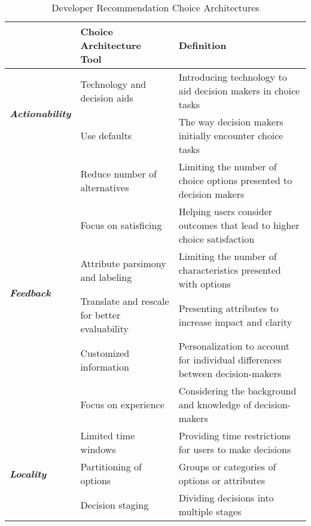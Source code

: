 \begin{landscape}
\thispagestyle{empty}
\begin{table*}
\caption{Developer Recommendation Choice Architectures}
    \begin{tabular}{ |l|l|l| }
	\hline
	\textbf{} & \textbf{Choice Architecture Tool~\cite{johnson2012beyond}} & \textbf{Definition} \\
	\hline
	\multirow{2}{*}{\textbf{\em Actionability}} 
	 & Technology and decision aids & Introducing technology to aid decision makers in choice tasks \\ \cline{2-3}
	 & Use defaults & The way decision makers initially encounter choice tasks \\ \hline
	\multirow{6}{*}{\textbf{\em Feedback}}
	 & Reduce number of alternatives & Limiting the number of choice options presented to decision makers \\ \cline{2-3}
	 & Focus on satisficing & Helping users consider outcomes that lead to higher choice satisfaction \\ \cline{2-3}
	 & Attribute parsimony and labeling & Limiting the number of characteristics presented with options \\ \cline{2-3}
	 & Translate and rescale for better evaluability & Presenting attributes to increase impact and clarity \\ \cline{2-3}
	 & Customized information & Personalization to account for individual differences between decision-makers \\ \cline{2-3}
	 & Focus on experience & Considering the background and knowledge of decision-makers \\ \hline
	\multirow{3}{*}{\textbf{\em Locality}}
	 & Limited time windows & Providing time restrictions for users to make decisions \\ \cline{2-3}
	 & Partitioning of options & Groups or categories of options or attributes \\ \cline{2-3}
	 & Decision staging & Dividing decisions into multiple stages \\ \hline 
\end{tabular}
\label{tab:framework}
\end{table*}
\raisebox{-8.646cm}{\makebox[\linewidth]{\thepage}}
\end{landscape}
\restoregeometry